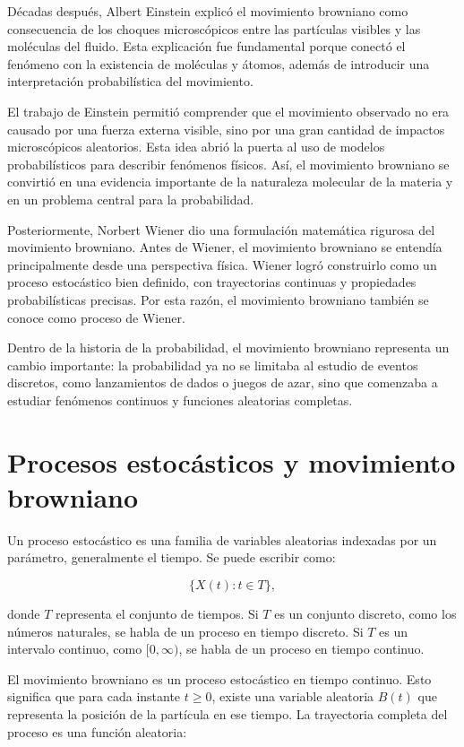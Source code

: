 \documentclass[12pt]{article}
\begin{document}
Décadas después, Albert Einstein explicó el movimiento browniano como consecuencia de los choques microscópicos entre las partículas visibles y las moléculas del fluido. Esta explicación fue fundamental porque conectó el fenómeno con la existencia de moléculas y átomos, además de introducir una interpretación probabilística del movimiento.

El trabajo de Einstein permitió comprender que el movimiento observado no era causado por una fuerza externa visible, sino por una gran cantidad de impactos microscópicos aleatorios. Esta idea abrió la puerta al uso de modelos probabilísticos para describir fenómenos físicos. Así, el movimiento browniano se convirtió en una evidencia importante de la naturaleza molecular de la materia y en un problema central para la probabilidad.

Posteriormente, Norbert Wiener dio una formulación matemática rigurosa del movimiento browniano. Antes de Wiener, el movimiento browniano se entendía principalmente desde una perspectiva física. Wiener logró construirlo como un proceso estocástico bien definido, con trayectorias continuas y propiedades probabilísticas precisas. Por esta razón, el movimiento browniano también se conoce como proceso de Wiener.

Dentro de la historia de la probabilidad, el movimiento browniano representa un cambio importante: la probabilidad ya no se limitaba al estudio de eventos discretos, como lanzamientos de dados o juegos de azar, sino que comenzaba a estudiar fenómenos continuos y funciones aleatorias completas.

\section{Procesos estocásticos y movimiento browniano}

Un proceso estocástico es una familia de variables aleatorias indexadas por un parámetro, generalmente el tiempo. Se puede escribir como:

\[
\{X(t): t \in T\},
\]

donde $T$ representa el conjunto de tiempos. Si $T$ es un conjunto discreto, como los números naturales, se habla de un proceso en tiempo discreto. Si $T$ es un intervalo continuo, como $[0,\infty)$, se habla de un proceso en tiempo continuo.

El movimiento browniano es un proceso estocástico en tiempo continuo. Esto significa que para cada instante $t \geq 0$, existe una variable aleatoria $B(t)$ que representa la posición de la partícula en ese tiempo. La trayectoria completa del proceso es una función aleatoria:
\end{document}
